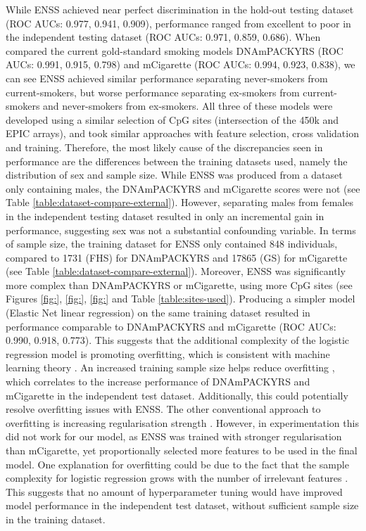 \documentclass{article} %
\begin{document}
While ENSS achieved near perfect discrimination in the hold-out testing dataset (ROC AUCs: 0.977, 0.941, 0.909), performance ranged from excellent to poor in the independent testing dataset (ROC AUCs: 0.971, 0.859, 0.686). When compared the current gold-standard smoking models DNAmPACKYRS (ROC AUCs: 0.991, 0.915, 0.798) and mCigarette (ROC AUCs: 0.994, 0.923, 0.838), we can see ENSS achieved similar performance separating never-smokers from current-smokers, but worse performance separating ex-smokers from current-smokers and never-smokers from ex-smokers. All three of these models were developed using a similar selection of CpG sites (intersection of the 450k and EPIC arrays), and took similar approaches with feature selection, cross validation and training. Therefore, the most likely cause of the discrepancies seen in performance are the differences between the training datasets used, namely the distribution of sex and sample size. While ENSS was produced from a dataset only containing males, the DNAmPACKYRS and mCigarette scores were not (see Table \ref{table:dataset-compare-external}). However, separating males from females in the independent testing dataset resulted in only an incremental gain in performance, suggesting sex was not a substantial confounding variable. In terms of sample size, the training dataset for ENSS only contained 848 individuals, compared to \num{1731} (FHS) for DNAmPACKYRS and \num{17865} (GS) for mCigarette (see Table \ref{table:dataset-compare-external}). Moreover, ENSS was significantly more complex than DNAmPACKYRS or mCigarette, using more CpG sites (see Figures \ref{fig:}, \ref{fig:}, \ref{fig:} and Table \ref{table:sites-used}). Producing a simpler model (Elastic Net linear regression) on the same training dataset resulted in performance comparable to DNAmPACKYRS and mCigarette (ROC AUCs: 0.990, 0.918, 0.773). This suggests that the additional complexity of the logistic regression model is promoting overfitting, which is consistent with machine learning theory \cite{bishop2006pattern}. An increased training sample size helps reduce overfitting \cite{bishop2006pattern}, which correlates to the increase performance of DNAmPACKYRS and mCigarette in the independent test dataset. Additionally, this could potentially resolve overfitting issues with ENSS. The other conventional approach to overfitting is increasing regularisation strength \cite{buhlmann2011statistics}. However, in experimentation this did not work for our model, as ENSS was trained with stronger regularisation than mCigarette, yet proportionally selected more features to be used in the final model. One explanation for  overfitting could be due to the fact that the sample complexity for logistic regression grows with the number of irrelevant features \cite{ng2004feature}. This suggests that no amount of hyperparameter tuning would have improved model performance in the independent test dataset, without sufficient sample size in the training dataset.
\end{document}
